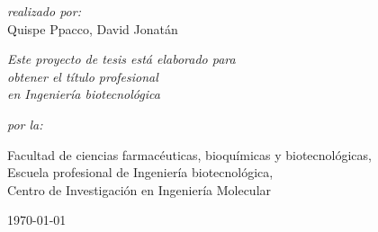 \documentclass[a4paper,11pt,oneside]{book}
\numberwithin{equation}{section}
\begin{document}
\begin{titlepage}
\begin{center}
\large{\textit{realizado por:}} \\
\Large{Quispe Ppacco, David Jonatán}  %

\vspace{1cm}

\large \textit{
Este proyecto de tesis está elaborado para\\ 
obtener el título profesional\\
en Ingeniería biotecnológica} 

\vspace{2cm} %

\textit{por la:}

\vspace{0.4cm}

Facultad de ciencias farmacéuticas, bioquímicas y biotecnológicas,\\ 
Escuela profesional de Ingeniería biotecnológica,\\ 
Centro de Investigación en Ingeniería Molecular

\vspace{1.0cm} 

\today
 
\end{center}
\end{titlepage}


%


%

\end{document}
